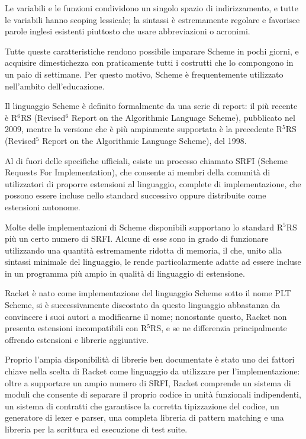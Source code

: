 Le variabili e le funzioni condividono un singolo spazio di
indirizzamento, e tutte le variabili hanno scoping lessicale; la sintassi
\`e estremamente regolare e favorisce parole inglesi esistenti piuttosto
che usare abbreviazioni o acronimi.

Tutte queste caratteristiche rendono possibile imparare Scheme in pochi
giorni, e acquisire dimestichezza con praticamente tutti i costrutti che
lo compongono in un paio di settimane. Per questo motivo, Scheme \`e
frequentemente utilizzato nell'ambito dell'educazione.

Il linguaggio Scheme \`e definito formalmente da una serie di report: il
pi\`u recente \`e R$^{6}$RS (Revised$^{6}$ Report on the Algorithmic
Language Scheme\cite{r6rs}), pubblicato nel 2009, mentre la versione che
\`e pi\`u ampiamente supportata \`e la precedente R$^{5}$RS (Revised$^{5}$
Report on the Algorithmic Language Scheme\cite{r5rs}), del 1998.

Al di fuori delle specifiche ufficiali, esiste un processo chiamato
SRFI (Scheme Requests For Implementation), che consente ai membri della
comunit\`a di utilizzatori di proporre estensioni al linguaggio, complete
di implementazione, che possono essere incluse nello standard successivo
oppure distribuite come estensioni autonome.

Molte delle implementazioni di Scheme disponibili supportano lo
standard R$^{5}$RS pi\`u un certo numero di SRFI. Alcune di esse sono
in grado di funzionare utilizzando una quantit\`a estremamente ridotta
di memoria, il che, unito alla sintassi minimale del linguaggio, le
rende particolarmente adatte ad essere incluse in un programma pi\`u
ampio in qualit\`a di linguaggio di estensione.

Racket \`e nato come implementazione del linguaggio Scheme sotto il nome
PLT Scheme, si \`e successivamente discostato da questo linguaggio
abbastanza da convincere i suoi autori a modificarne il nome; nonostante
questo, Racket non presenta estensioni incompatibili con R$^{5}$RS, e
se ne differenzia principalmente offrendo estensioni e librerie
aggiuntive.

Proprio l'ampia disponibilit\`a di librerie ben documentate \`e stato
uno dei fattori chiave nella scelta di Racket come linguaggio da
utilizzare per l'implementazione: oltre a supportare un ampio numero
di SRFI, Racket comprende un sistema di moduli che consente di separare
il proprio codice in unit\`a funzionali indipendenti, un sistema di
contratti che garantisce la corretta tipizzazione del codice, un
generatore di lexer e parser, una completa libreria di pattern matching
e una libreria per la scrittura ed esecuzione di test suite.

